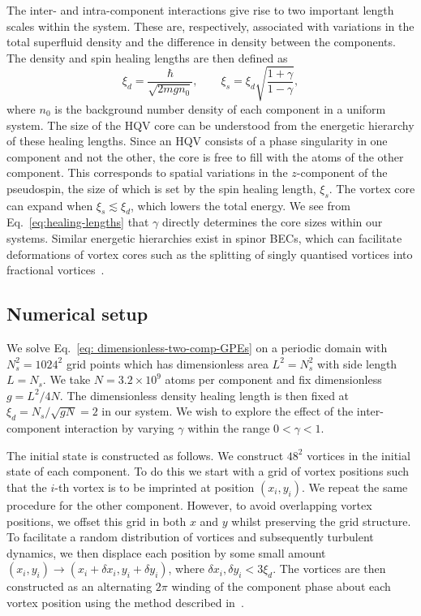 The inter- and intra-component interactions give rise to two important length
scales within the system.
These are, respectively, associated with variations in the total superfluid
density and the difference in density between the components.
The density and spin healing lengths are then defined as~\cite{Eto2011}
\begin{equation}
    \xi_d = \frac{\hbar}{\sqrt{2mgn_0}}, \qquad 
    \xi_s = \xi_d \sqrt{\frac{1 + \gamma}{1 - \gamma}},
    \label{eq:healing-lengths}
\end{equation}
where \(n_0\) is the background number density of each component in a uniform
system.
The size of the HQV core can be understood from the energetic hierarchy of
these healing lengths.
Since an HQV consists of a phase singularity in one component and not the other,
the core is free to fill with the atoms of the other component.
This corresponds to spatial variations in the \( z \)-component of the
pseudospin, the size of which is set by the spin healing length, \(\xi_s\).
The vortex core can expand when \(\xi_s \lesssim \xi_d\), which lowers
the total energy.
We see from Eq.~\eqref{eq:healing-lengths} that \(\gamma \) directly determines
the core sizes within our systems.
Similar energetic hierarchies exist in spinor BECs, which can facilitate
deformations of vortex cores such as the splitting of singly quantised vortices
into fractional vortices~\cite{Seo2015}.

\subsection{Numerical setup}\label{sec:numerical-setup}
We solve Eq.~\eqref{eq: dimensionless-two-comp-GPEs} on a periodic domain with 
\(N_s^2=1024^2\) grid points which has dimensionless area \(L^2=N_s^2\) with
side length \(L=N_s\).
We take \(N=3.2\times10^9\) atoms per component and fix dimensionless
\(g=L^2/4N\).
The dimensionless density healing length is then fixed at
\(\xi_d=N_s/\sqrt{gN}=2\) in our system.
We wish to explore the effect of the inter-component interaction by varying
\(\gamma \) within the range \(0 < \gamma < 1\).

The initial state is constructed as follows.
We construct \(48^2\) vortices in the initial state of each component.
To do this we start with a grid of vortex positions such that the 
\(i\)-th vortex is to be imprinted at position \((x_i, y_i)\).
We repeat the same procedure for the other component.
However, to avoid overlapping vortex positions, we offset this grid in both
\(x\) and \(y\) whilst preserving the grid structure.
To facilitate a random distribution of vortices and subsequently turbulent
dynamics, we then displace each position by some small amount 
\((x_i, y_i) \rightarrow (x_i + \delta x_i, y_i + \delta y_i)\), where 
\(\delta x_i, \delta y_i < 3\xi_d\).
The vortices are then constructed as an alternating \( 2\pi \) winding of the
component phase about each vortex position using the method described
in~\cite{Billam2014}.

